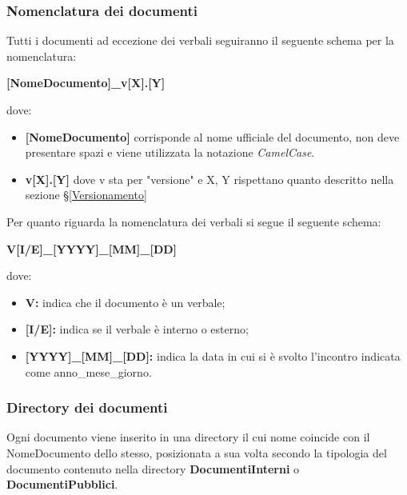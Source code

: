 \subsubsection{Nomenclatura dei documenti} \label{NomenclaturaDoc}
Tutti i documenti ad eccezione dei verbali seguiranno il seguente schema per la nomenclatura:
\begin{center}
	\textbf{[NomeDocumento]\_v[X].[Y]}
\end{center}
dove:
\begin{itemize}
	\item \textbf{[NomeDocumento]} corrisponde al nome ufficiale del documento, non deve presentare spazi e viene utilizzata la notazione \textit{CamelCase}.
	\item \textbf{v[X].[Y]} dove v sta per "versione" e X, Y rispettano quanto descritto nella sezione \S\ref{Versionamento}
\end{itemize}
Per quanto riguarda la nomenclatura dei verbali si segue il seguente schema:
\begin{center}
	\textbf{V[I/E]\_[YYYY]\_[MM]\_[DD]}
\end{center}
dove:
\begin{itemize}
	\item \textbf{V:} indica che il documento è un verbale;
	\item \textbf{[I/E]:} indica se il verbale è interno o esterno;
	\item \textbf{[YYYY]\_[MM]\_[DD]:} indica la data in cui si è svolto l'incontro indicata come anno\_mese\_giorno.
\end{itemize}

\subsubsection{Directory dei documenti}
Ogni documento viene inserito in una directory il cui nome coincide con il NomeDocumento dello stesso, posizionata a sua volta secondo la tipologia del documento contenuto nella directory \textbf{DocumentiInterni} o \textbf{DocumentiPubblici}.

